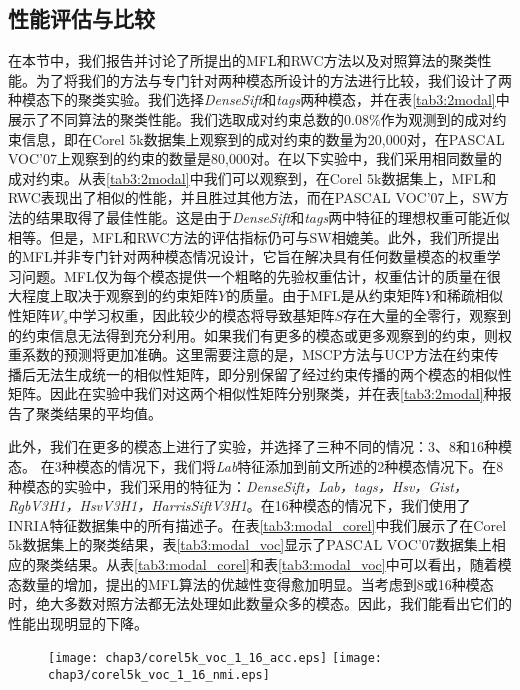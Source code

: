 \subsection{性能评估与比较}
在本节中，我们报告并讨论了所提出的MFL和RWC方法以及对照算法的聚类性能。为了将我们的方法与专门针对两种模态所设计的方法进行比较，我们设计了两种模态下的聚类实验。我们选择\textit{DenseSift}和\textit{tags}两种模态，并在表\ref{tab3:2modal}中展示了不同算法的聚类性能。我们选取成对约束总数的$0.08\%$作为观测到的成对约束信息，即在Corel 5k数据集上观察到的成对约束的数量为20,000对，在PASCAL VOC'07上观察到的约束的数量是80,000对。在以下实验中，我们采用相同数量的成对约束。从表\ref{tab3:2modal}中我们可以观察到，在Corel 5k数据集上，MFL和RWC表现出了相似的性能，并且胜过其他方法，而在PASCAL VOC'07上，SW方法的结果取得了最佳性能。这是由于\textit{DenseSift}和\textit{tags}两中特征的理想权重可能近似相等。但是，MFL和RWC方法的评估指标仍可与SW相媲美。此外，我们所提出的MFL并非专门针对两种模态情况设计，它旨在解决具有任何数量模态的权重学习问题。MFL仅为每个模态提供一个粗略的先验权重估计，权重估计的质量在很大程度上取决于观察到的约束矩阵$ {Y} $的质量。由于MFL是从约束矩阵$ {Y} $和稀疏相似性矩阵${W}_s $中学习权重，因此较少的模态将导致基矩阵$ {S} $存在大量的全零行，观察到的约束信息无法得到充分利用。如果我们有更多的模态或更多观察到的约束，则权重系数的预测将更加准确。这里需要注意的是，MSCP方法与UCP方法在约束传播后无法生成统一的相似性矩阵，即分别保留了经过约束传播的两个模态的相似性矩阵。因此在实验中我们对这两个相似性矩阵分别聚类，并在表\ref{tab3:2modal}种报告了聚类结果的平均值。

此外，我们在更多的模态上进行了实验，并选择了三种不同的情况：3、8和16种模态。 在3种模态的情况下，我们将\textit{Lab}特征添加到前文所述的2种模态情况下。在8种模态的实验中，我们采用的特征为：\textit{DenseSift，Lab，tags，Hsv，Gist，RgbV3H1，HsvV3H1，HarrisSiftV3H1}。在16种模态的情况下，我们使用了INRIA特征数据集中的所有描述子。在表\ref{tab3:modal_corel}中我们展示了在Corel 5k数据集上的聚类结果，表\ref{tab3:modal_voc}显示了PASCAL VOC'07数据集上相应的聚类结果。从表\ref{tab3:modal_corel}和表\ref{tab3:modal_voc}中可以看出，随着模态数量的增加，提出的MFL算法的优越性变得愈加明显。当考虑到8或16种模态时，绝大多数对照方法都无法处理如此数量众多的模态。因此，我们能看出它们的性能出现明显的下降。

\begin{figure}[t]
    \centering
    \texttt{[image: chap3/corel5k\_voc\_1\_16\_acc.eps]}
    \texttt{[image: chap3/corel5k\_voc\_1\_16\_nmi.eps]}
	\label{fig3:1_16}
\end{figure} 

